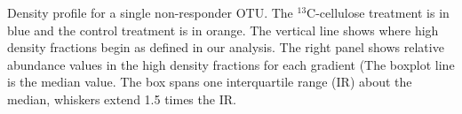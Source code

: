 Density profile for a single non-responder OTU. The $^{13}$C-cellulose
treatment is in blue and the control treatment is in orange. The vertical line
shows where high density fractions begin as defined in our analysis. The right
panel shows relative abundance values in the high density fractions for each
gradient (The boxplot line is the median value. The box spans one
interquartile range (IR) about the median, whiskers extend 1.5 times the IR.  

